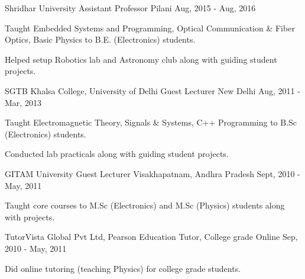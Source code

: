 

\begin{cventries}


  \cventry
    {Shridhar University} %
    {Assistant Professor} %
    {Pilani} %
    {Aug, 2015 - Aug, 2016} %
    {
      \begin{cvitems} %
        \item {Taught Embedded Systems and Programming, Optical Communication \& Fiber Optics, Basic Physics to B.E. (Electronics) students.}
        \item {Helped setup Robotics lab and Astronomy club along with guiding student projects.}
      \end{cvitems}
    }
  \cventry
    {SGTB Khalsa College, University of Delhi} %
    {Guest Lecturer} %
    {New Delhi} %
    {Aug, 2011 - Mar, 2013} %
    {
      \begin{cvitems} %
        \item {Taught Electromagnetic Theory, Signals \& Systems, C++ Programming to B.Sc (Electronics) students.}
        \item {Conducted lab practicals along with guiding student projects.}
      \end{cvitems}
    }

  \cventry
    {GITAM University} %
    {Guest Lecturer} %
    {Visakhapatnam, Andhra Pradesh} %
    {Sept, 2010 - May, 2011} %
    {
      \begin{cvitems} %
        \item {Taught core courses to M.Sc (Electronics) and M.Sc (Physics) students along with projects.}
      \end{cvitems}
    }
  \cventry
    {TutorVista Global Pvt Ltd, Pearson Education} %
    {Tutor, College grade} %
    {Online} %
    {Sep, 2010 - May, 2011} %
    {
      \begin{cvitems} %
        \item {Did online tutoring (teaching Physics) for college grade students.}
      \end{cvitems}
    }


\end{cventries}
